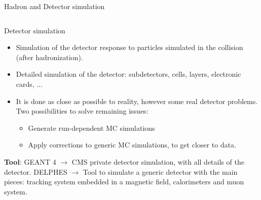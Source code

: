 \begin{frame}{Hadron and Detector simulation}
\begin{columns}
\begin{column}{.50\textwidth}
  \begin{block}{Detector simulation}\scriptsize
    \begin{itemize}
    \item Simulation of the detector response to particles simulated in the collision (after hadronization).
    \item Detailed simulation of the detector: subdetectors, cells, layers, electronic cards, ...
    \item It is done as close as possible to reality, however some real detector problems. Two possibilities to solve remaining issues:
      \begin{itemize}\scriptsize
      \item Generate run-dependent MC simulations
      \item Apply corrections to generic MC simulations, to get closer to data.
      \end{itemize}
    \end{itemize}
  \end{block}
\vspace{-.3cm}
\begin{block}{}\tiny
\textbf{Tool}: GEANT 4 $\to$ CMS private detector simulation, with all details of the detector. DELPHES $\to$ Tool to simulate a generic detector with the main pieces: tracking system embedded in a magnetic field, calorimeters and muon system.
\end{block}

\end{column}

\end{columns}
\end{frame}


